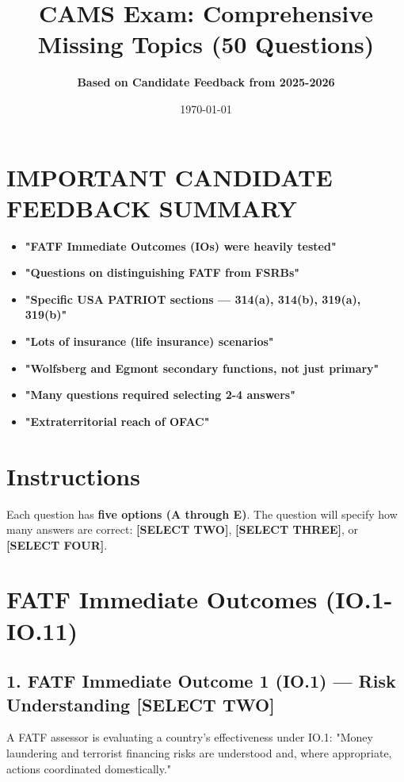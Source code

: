 \documentclass[11pt,a4paper]{article}
\title{\textbf{CAMS Exam: Comprehensive Missing Topics (50 Questions)}}
\author{\textbf{Based on Candidate Feedback from 2025-2026}}
\date{\today}
\begin{document}
	
	\maketitle
	
	\section*{IMPORTANT CANDIDATE FEEDBACK SUMMARY}
	\begin{itemize}
		\item \textbf{"FATF Immediate Outcomes (IOs) were heavily tested"}
		\item \textbf{"Questions on distinguishing FATF from FSRBs"}
		\item \textbf{"Specific USA PATRIOT sections — 314(a), 314(b), 319(a), 319(b)"}
		\item \textbf{"Lots of insurance (life insurance) scenarios"}
		\item \textbf{"Wolfsberg and Egmont secondary functions, not just primary"}
		\item \textbf{"Many questions required selecting 2-4 answers" }
		\item \textbf{"Extraterritorial reach of OFAC"}
	\end{itemize}
	
	\section*{Instructions}
	Each question has \textbf{five options (A through E)}. 
	The question will specify how many answers are correct: \textbf{[SELECT TWO]}, \textbf{[SELECT THREE]}, or \textbf{[SELECT FOUR]}.
	
	\newpage
	
	\section{FATF Immediate Outcomes (IO.1-IO.11)}
	
	\subsection{1. FATF Immediate Outcome 1 (IO.1) — Risk Understanding \textnormal{[SELECT TWO]}}
	
	A FATF assessor is evaluating a country's effectiveness under IO.1: "Money laundering and terrorist financing risks are understood and, where appropriate, actions coordinated domestically."
	
\end{document}
